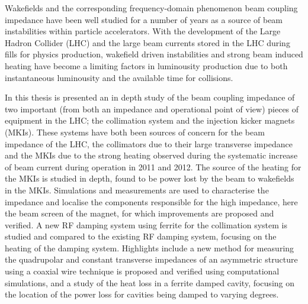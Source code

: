 Wakefields and the corresponding frequency-domain phenomenon beam coupling impedance have been well studied for a number of years as a source of beam instabilities within particle accelerators. With the development of the Large Hadron Collider (LHC) and the large beam currents stored in the LHC during fills for physics production, wakefield driven instabilities and strong beam induced heating have become a limiting factors in luminousity production due to both instantaneous luminousity and the available time for collisions.

In this thesis is presented an in depth study of the beam coupling impedance of two important (from both an impedance and operational point of view) pieces of equipment in the LHC; the collimation system and the injection kicker magnets (MKIs). These systems have both been sources of concern for the beam impedance of the LHC, the collimators due to their large transverse impedance and the MKIs due to the strong heating observed during the systematic increase of beam current during operation in 2011 and 2012. The source of the heating for the MKIs is studied in depth, found to be power lost by the beam to wakefields in the MKIs. Simulations and measurements are used to characterise the impedance and localise the components responsible for the high impedance, here the beam screen of the magnet, for which improvements are proposed and verified. A new RF damping system using ferrite for the collimation system is studied and compared to the existing RF damping system, focusing on the heating of the damping system. Highlights include a new method for measuring the quadrupolar and constant transverse impedances of an asymmetric structure using a coaxial wire technique is proposed and verified using computational simulations, and a study of the heat loss in a ferrite damped cavity, focusing on the location of the power loss for cavities being damped to varying degrees. 